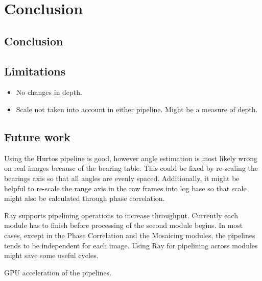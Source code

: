 \chapter{Conclusion}
\label{chap:conclusion}

\section{Conclusion}

\section{Limitations}

\begin{itemize}
    \item No changes in depth.
    \item Scale not taken into account in either pipeline. Might be a measure of depth.
\end{itemize}


\section{Future work}

Using the Hurtos pipeline is good, however angle estimation is most likely wrong on real images because of the bearing table. This could be fixed by re-scaling the bearings axis so that all angles are evenly spaced. Additionally, it might be helpful to re-scale the range axis in the raw frames into log base so that scale might also be calculated through phase correlation. 

Ray supports pipelining operations to increase throughput. Currently each module has to finish before processing of the second module begins. In most cases, except in the Phase Correlation and the Mosaicing modules, the pipelines tends to be independent for each image. Using Ray for pipelining across modules might save some useful cycles.

GPU acceleration of the pipelines.